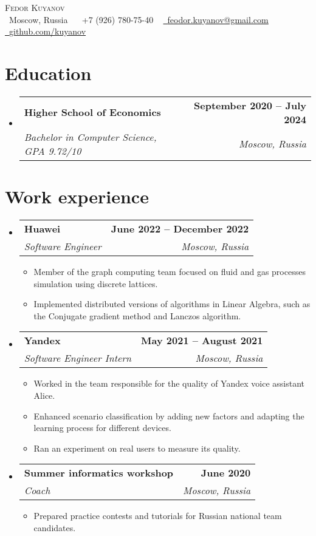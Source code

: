 \documentclass[letterpaper,11pt]{article}
\makeatletter
\newcommand{\resumeTwoLineHeading}[4]{
	\item
	\begin{tabular*}{1.0\textwidth}[t]{l@{\extracolsep{\fill}}r}
		\textbf{#1} & \textbf{\small #2} \\
		\textit{\small #3} & \textit{\small #4} \\
	\end{tabular*}\vspace{-7pt}
}
\newcommand{\resumeSubHeadingListStart}{\begin{itemize}[leftmargin=0.0in, label={}]}
\newcommand{\resumeSubHeadingListEnd}{\end{itemize}}
\newcommand{\resumeItemListStart}{\begin{itemize}}
\newcommand{\resumeItemListEnd}{\end{itemize}\vspace{-8pt}}
\newcommand{\resumeItem}[1]{\item\small{{#1 \vspace{-2pt}}}}
\makeatother
\begin{document}
\begin{center}
	{\Huge \scshape Fedor Kuyanov} \\ \vspace{10pt}
	\small \raisebox{-0.1\height}\faHome\ Moscow, Russia ~ \small \raisebox{-0.1\height}\faPhone\ +7 (926) 780-75-40 ~ \href{mailto:feodor.kuyanov@gmail.com}{\raisebox{-0.2\height}\faEnvelope\  \underline{feodor.kuyanov@gmail.com}} ~ 
	\href{https://github.com/kuyanov}{\raisebox{-0.2\height}\faGithub\ \underline{github.com/kuyanov}}
	\vspace{-8pt}
\end{center}


\section{Education}

\resumeSubHeadingListStart
\resumeTwoLineHeading
{Higher School of Economics}{September 2020 -- July 2024}
{Bachelor in Computer Science, GPA 9.72/10}{Moscow, Russia}
\resumeSubHeadingListEnd


\section{Work experience}

\resumeSubHeadingListStart

\resumeTwoLineHeading
{Huawei}{June 2022 -- December 2022}
{Software Engineer}{Moscow, Russia}
\resumeItemListStart
\resumeItem{Member of the graph computing team focused on fluid and gas processes simulation using discrete lattices.}
\resumeItem{Implemented distributed versions of algorithms in Linear Algebra, such as the Conjugate gradient method and Lanczos algorithm.}
\resumeItemListEnd

\resumeTwoLineHeading
{Yandex}{May 2021 -- August 2021}
{Software Engineer Intern}{Moscow, Russia}
\resumeItemListStart
\resumeItem{Worked in the team responsible for the quality of Yandex voice assistant Alice.}
\resumeItem{Enhanced scenario classification by adding new factors and adapting the learning process for different devices.}
\resumeItem{Ran an experiment on real users to measure its quality.}
\resumeItemListEnd

\resumeTwoLineHeading
{Summer informatics workshop}{June 2020}
{Coach}{Moscow, Russia}
\resumeItemListStart
\resumeItem{Prepared practice contests and tutorials for Russian national team candidates.}
\resumeItemListEnd

\resumeSubHeadingListEnd
\end{document}
